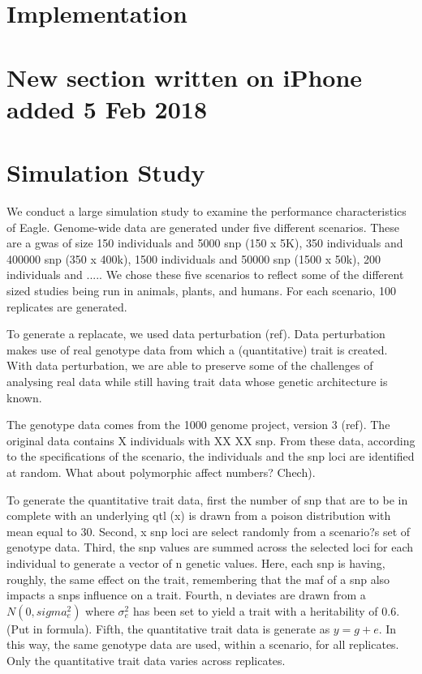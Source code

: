 \documentclass{nature}
\begin{document}
\section{Implementation}

\section{New section written on iPhone added 5 Feb 2018}
\section{Simulation Study}
We conduct a large simulation study to examine the performance characteristics of Eagle. Genome-wide data are generated under five different scenarios. These are a gwas of size 150 individuals and 5000 snp (150 x 5K), 350 individuals and 400000 snp (350 x 400k), 1500 individuals and 50000 snp (1500 x 50k), 200 individuals and ..... We chose these five scenarios to reflect some of the different sized studies being run in animals, plants, and humans. For each scenario, 100 replicates are generated.

To generate a replacate, we used data perturbation (ref). Data perturbation makes use of real genotype data from which a (quantitative) trait is created.
With data perturbation, we are able to preserve some of the challenges of analysing real data while still having trait data whose genetic architecture is known.

The genotype data comes from the 1000 genome project, version 3 (ref). The original data contains X individuals with XX XX snp. From these data, according to the specifications of the scenario, the individuals and the snp loci are identified at random. What about polymorphic affect numbers? Chech).

To generate the quantitative trait data, first the number of snp that are to be in complete with an underlying qtl (x) is drawn from a poison distribution with mean equal to 30. Second, x snp loci are select randomly from a scenario?s set of genotype data. Third, the snp values are summed across the selected loci for each individual to generate a vector of n genetic values. Here, each snp is having, roughly, the same effect on the trait, remembering that the maf of a snp also impacts a snps influence on a trait. Fourth, n deviates are drawn from a $N(0,sigma^2_e)$ where $\sigma_e^2$ has been set to yield a trait with a heritability of 0.6. (Put in formula). Fifth, the quantitative trait data is generate as $y = g + e$. In this way, the same genotype data are used, within a scenario, for all replicates. Only the quantitative trait data varies across replicates.
\end{document}
